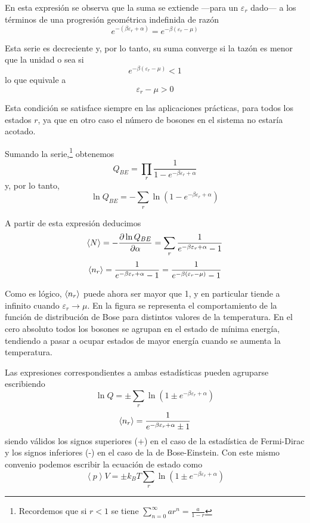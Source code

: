 En esta expresión se observa que la suma se extiende ---para un $\varepsilon_r$ dado--- a los términos de una progresión geométrica indefinida de razón
$$e^{-(\beta\varepsilon_r + \alpha)} = e^{-\beta(\varepsilon_r - \mu)}$$
	
Esta serie es decreciente y, por lo tanto, su suma converge si la tazón es menor que la unidad o sea si
$$e^{-\beta(\varepsilon_r - \mu)} < 1$$
lo que equivale a
\begin{equation}\label{eq:cond_FD}
	\varepsilon_r - \mu > 0
\end{equation}

Esta condición se satisface siempre en las aplicaciones prácticas, para todos los estados $r$, ya que en otro caso el número de bosones en el sistema no estaría acotado.

Sumando la serie,\footnote{Recordemos que si $r < 1$ se tiene $\sum_{n=0}^{\infty} ar^n = \frac{a}{1-r}$} obtenemos
\begin{equation}
	Q_{BE} = \prod_r \frac{1}{1 - e^{-\beta\varepsilon_r + \alpha}}
\end{equation}
y, por lo tanto,
\begin{equation}\label{eq:Q_BE}
	\ln Q_{BE} = - \sum_r \ln (1 - e^{-\beta\varepsilon_r + \alpha})
\end{equation}

A partir de esta expresión deducimos
\begin{equation}
	\expval{N} = - \frac{\partial \ln Q_{BE}}{\partial \alpha} = \sum_r \frac{1}{e^{-\beta\varepsilon_r + \alpha} - 1}
\end{equation}
\begin{equation}\label{eq:n_r_BE}
	\expval{n_r} = \frac{1}{e^{-\beta\varepsilon_r + \alpha} - 1} = \frac{1}{e^{-\beta(\varepsilon_r - \mu)} - 1}
\end{equation}

Como es lógico, $\expval{n_r}$ puede ahora ser mayor que 1, y en particular tiende a infinito cuando $\varepsilon_r \rightarrow \mu$.
En la figura se representa el comportamiento de la función de distribución de Bose para distintos valores de la temperatura.
En el cero absoluto todos los bosones se agrupan en el estado de mínima energía, tendiendo a pasar a ocupar estados de mayor energía cuando se aumenta la temperatura.

Las expresiones correspondientes a ambas estadísticas pueden agruparse escribiendo
\begin{equation}
	\ln Q = \pm \sum_r 	\ln (1 \pm e^{-\beta\varepsilon_r + \alpha})
\end{equation}
\begin{equation}\label{eq:n_e_BE}
	\expval{n_r} = \frac{1}{e^{-\beta\varepsilon_r + \alpha} \pm 1}
\end{equation}
siendo válidos los signos superiores (+) en el caso de la estadística de Fermi-Dirac y
los signos inferiores (-) en el caso de la de Bose-Einstein.
Con este mismo convenio podemos escribir la ecuación de estado como
\begin{equation}
	\left\langle p \right\rangle V = \pm k_B T \sum_r \ln (1 \pm e^{-\beta\varepsilon_r + \alpha})
\end{equation}

